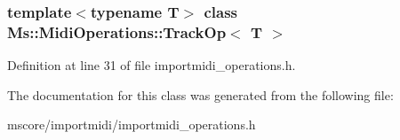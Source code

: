 \subsubsection*{template$<$typename T$>$\newline
class Ms\+::\+Midi\+Operations\+::\+Track\+Op$<$ T $>$}



Definition at line 31 of file importmidi\+\_\+operations.\+h.



The documentation for this class was generated from the following file\+:\begin{DoxyCompactItemize}
\item 
mscore/importmidi/importmidi\+\_\+operations.\+h\end{DoxyCompactItemize}
